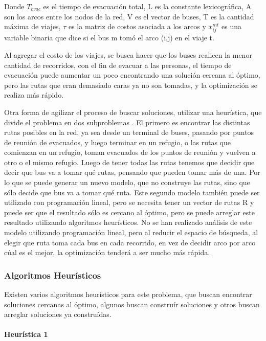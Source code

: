 \documentclass[letter, 10pt]{article}
\begin{document}
Donde $T_{evac}$ es el tiempo de evacuación total, L es la constante lexicográfica, A son los arcos entre los nodos de la red, V es el vector de buses, T es la cantidad máxima de viajes, $\tau$ es la matriz de costos asociada a los arcos y  $x_{ij}^{mt}$ es una variable binaria que dice si el bus m tomó el arco (i,j) en el viaje t.

Al agregar el costo de los viajes, se busca hacer que los buses realicen la menor cantidad de recorridos, con el fin de evacuar a las personas, el tiempo de evacuación puede aumentar un poco encontrando una solución cercana al óptimo, pero las rutas que eran demasiado caras ya no son tomadas, y la optimización se realiza más rápido.

Otra forma de agilizar el proceso de buscar soluciones, utilizar una heurística, que divide el problema en dos subproblemas \cite{bish2011planning}. El primero es encontrar las distintas rutas posibles en la red, ya sea desde un terminal de buses, pasando por puntos de reunión de evacuados, y luego terminar en un refugio, o las rutas que comienzan en un refugio, toman evacuados de los puntos de reunión y vuelven a otro o el mismo refugio. Luego de tener todas las rutas tenemos que decidir que decir que bus va a tomar qué rutas, pensando que pueden tomar más de una. Por lo que se puede generar un nuevo modelo, que no construye las rutas, sino que sólo decide que bus va a tomar qué ruta. Este segundo modelo también puede ser utilizado con programación lineal, pero se necesita tener un vector de rutas R y puede ser que el resultado sólo es cercano al óptimo, pero se puede arreglar este resultado utilizando algoritmos heurísticos. No se han realizado análisis de este modelo utilizando programación lineal, pero al reducir el espacio de búsqueda, al elegir que ruta toma cada bus en cada recorrido, en vez de decidir arco por arco cúal es el mejor, la optimización tenderá a ser mucho más rápida.

\subsubsection{Algoritmos Heurísticos}
Existen varios algoritmos heurísticos para este problema, que buscan encontrar soluciones cercanas al óptimo, algunos buscan construír soluciones y otros buscan arreglar soluciones ya construídas.

\paragraph{Heurística 1}
\end{document}
